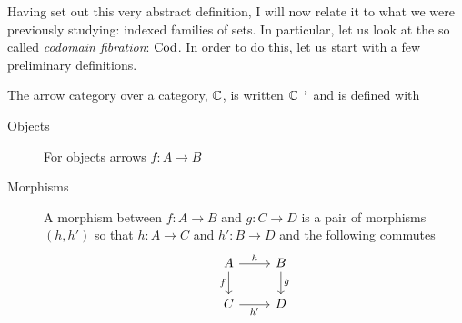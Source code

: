 Having set out this very abstract definition, I will now relate it to
what we were previously studying: indexed families of sets. In
particular, let us look at the so called \emph{codomain fibration}:
$\operatorname{Cod}$. In order to do this, let us start with a few preliminary
definitions.

\begin{defn}\label{defn:fibrations:arrowcat}
  The arrow category over a category, $\mathbb{C}$, is written
  $\mathbb{C}^{\to}$ and is defined with
  \begin{description}
  \item[Objects] For objects arrows $f : A \to B$
  \item[Morphisms] A morphism between $f : A \to B$ and $g : C \to D$
    is a pair of morphisms $(h, h')$ so that $h : A \to C$ and $h' : B
    \to D$ and the following commutes
    \[
      \begin{tikzcd}
        A \ar[d, "f", swap] \ar[r, "h"] & B \ar[d, "g"]\\
        C \ar[r, "h'", swap] & D
      \end{tikzcd}
    \]
  \end{description}
\end{defn}

